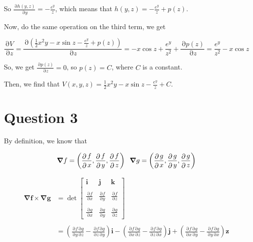 \documentclass[12pt]{article}
\renewcommand{\vec}[1]{\boldsymbol{#1}}
\DeclareMathOperator{\pt}{\partial}
\begin{document}
So $\displaystyle{\frac{\pt h(y,z)}{\pt y} = -\frac{e^y}{z}}
$, which means that $h(y,z) = \displaystyle{
    -\frac{e^y}{z} + p(z)
}$.

Now, do the same operation on the third term, we get

\[ \frac{\pt V}{\pt z} = \frac{\pt \left(
\frac{1}{2}x^2 y - x\sin z - \frac{e^y}{z} + p(z) \right)}{\pt z} 
= -x\cos z + \frac{e^y}{z^2} + \frac{ \pt p(z)}{\pt z}
= \frac{e^y}{z^2} - x\cos z\]

So, we get $\displaystyle{\frac{\pt p(z)}{\pt z} = 
0}$, so $p(z) = C$, where $C$ is a constant.

\vspace*{0.2cm}
Then, we find that $V(x,y,z) = \displaystyle{\frac{1}{2}
x^2y - x\sin z - \frac{e^y}{z} + C}$.







\newpage
\section*{Question 3}
By definition, we know that

\[ \vec{\nabla} f = \left(
    \frac{\pt f}{\pt x},\frac{\pt f}{\pt y},
    \frac{\pt f}{\pt z}
\right) \hspace*{0.2cm} 
\vec{\nabla} g = \left(
    \frac{\pt g}{\pt x},\frac{\pt g}{\pt y},
    \frac{\pt g}{\pt z}
\right)\]

\begin{align*} 
\vec{\nabla f} \times \vec{\nabla g} & = \det
\begin{bmatrix}
    \vec i & \vec j & \vec k \\
    & & \\
    \displaystyle{\frac{\pt f}{\pt x}} & \displaystyle{\frac{\pt f}{\pt y}} & \displaystyle{\frac{\pt f}{\pt z}} \\
    & & \\
    \displaystyle{\frac{\pt g}{\pt x}} & \displaystyle{\frac{\pt g}{\pt y}} & \displaystyle{\frac{\pt g}{\pt z}}
\end{bmatrix} \\
&\\
& = \displaystyle{\left( \frac{\pt f \pt g}{\pt y \pt z} - \frac{\pt f \pt g}{\pt z \pt y}\right)\vec i} 
- \displaystyle{\left( \frac{\pt f \pt g}{\pt x \pt z} - \frac{\pt f \pt g}{\pt z \pt x}\right)\vec j}
+ \displaystyle{\left( \frac{\pt f \pt g}{\pt x \pt y }-\frac{\pt f \pt g}{\pt y \pt x} \right)\vec z}
\end{align*}
\end{document}
